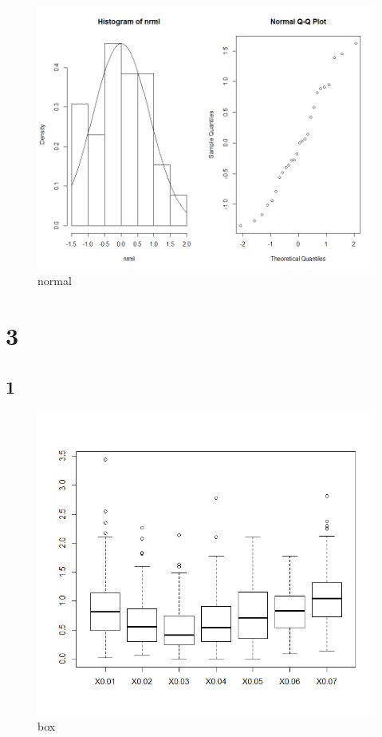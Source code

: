 \documentclass{article}
\begin{document}
    \begin{figure}[!htb]
      \includegraphics[scale=0.3]{../results/2_3_nrml.png}
      \caption{normal}
      \label{fig:normal}
    \end{figure}
    
    \section{3}
    \subsection*{1}
    \begin{figure}[!htb]
    \centering
      \includegraphics[scale=0.3]{../results/3_1.png}
      \caption{box}
      \label{fig:box}
    \end{figure}
\end{document}
